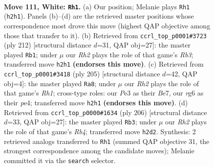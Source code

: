 \documentclass[11pt]{article}
\begin{document}
\clearpage

\begin{figure}[p]\centering
\begin{subfigure}{0.46\textwidth}\centering
\resizebox{\linewidth}{!}{%
\newchessgame
\chessboard[
  setfen={8/1k6/p5r1/P1p2p1p/1p3P1P/1P2PKP1/7R/8 w - - 9 111},
  showmover=false,
  pgfstyle=straightmove, color=movearrow, markmove={h2-h1}
]}
\caption{}
\end{subfigure}\hfill
\begin{subfigure}{0.46\textwidth}\centering
\resizebox{\linewidth}{!}{%
\newchessgame
\chessboard[
  setfen={8/5p2/4p2k/4Pp1p/5P1P/1R4PK/4r3/8 w - - 97 107},
  showmover=false,
  pgfstyle=straightmove, color=movearrow, markmove={b3-b1}
]}
\caption{}
\end{subfigure}
\\[4pt]
\begin{subfigure}{0.46\textwidth}\centering
\resizebox{\linewidth}{!}{%
\newchessgame
\chessboard[
  setfen={7r/2pkb3/1p1p4/1K1Pp3/2P1Pp2/P4P2/5NR1/8 b - - 10 103},
  showmover=false,
  pgfstyle=straightmove, color=movearrow, markmove={h8-a8}
]}
\caption{}
\end{subfigure}\hfill
\begin{subfigure}{0.46\textwidth}\centering
\resizebox{\linewidth}{!}{%
\newchessgame
\chessboard[
  setfen={8/2p5/3p2pk/r2Pp1p1/1RP1P3/5P1P/5K2/8 w - - 25 104},
  showmover=false,
  pgfstyle=straightmove, color=movearrow, markmove={b4-b3}
]}
\caption{}
\end{subfigure}
\caption{\textbf{Move 111, White: \texttt{Rh1}.} (a) Our position; Melanie plays \texttt{Rh1} (\texttt{h2h1}). Panels (b)--(d) are the retrieved master positions whose correspondence most drove this move (highest QAP objective among those that transfer to it). (b) Retrieved from \texttt{ccrl\_top\_p0001\#3723} (ply 212) [structural distance $d$=31, QAP obj=27]: the master played \texttt{Rb1}; under $\mu$ our \emph{Rh2} plays the role of that game's \emph{Rb3}; transferred move \texttt{h2h1} \textbf{(endorses this move)}. (c) Retrieved from \texttt{ccrl\_top\_p0001\#3418} (ply 205) [structural distance $d$=42, QAP obj=4]: the master played \texttt{Ra8}; under $\mu$ our \emph{Rh2} plays the role of that game's \emph{Rh1}; cross-type roles: our \emph{P}e3 as their \emph{B}e7, our \emph{r}g6 as their \emph{p}e4; transferred move \texttt{h2h1} \textbf{(endorses this move)}. (d) Retrieved from \texttt{ccrl\_top\_p0000\#1634} (ply 206) [structural distance $d$=33, QAP obj=27]: the master played \texttt{Rb3}; under $\mu$ our \emph{Rh2} plays the role of that game's \emph{Rb4}; transferred move \texttt{h2d2}. Synthesis: 2 retrieved analogs transferred to \texttt{Rh1} (summed QAP objective 31, the strongest correspondence among the candidate moves); Melanie committed it via the \texttt{search} selector.}
\label{fig:thought-m220}
\end{figure}
\end{document}
